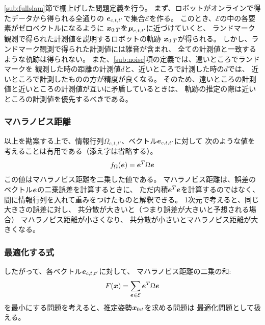 \ref{sub:fullslam}節で棚上げした問題定義を行う。
まず、ロボットがオンラインで得たデータから得られる全通りの
$\boldsymbol{e}_{c,t,t'}$で集合$\mathcal{E}$を作る。
このとき、$\mathcal{E}$の中の各要素がゼロベクトルになるように
$\boldsymbol{x}_{0:T}$を$\boldsymbol{\mu}_{c,t,t'}$に近づけていくと、
ランドマーク観測で得られた計測値を説明するロボットの軌跡
$\boldsymbol{x}_{0:T}$が得られる。
しかし、ランドマーク観測で得られた計測値には雑音が含まれ、
全ての計測値と一致するような軌跡は得られない。
また、\ref{sub:noise}項の定義では、遠いところでランドマークを
観測した時の距離の計測値$d$と、近いところで計測した時の$d$では、
近いところで計測したものの方が精度が良くなる。
そのため、遠いところの計測値と近いところの計測値が互いに矛盾しているときは、
軌跡の推定の際は近いところの計測値を優先するべきである。

\subsubsection{マハラノビス距離}

以上を勘案する上で、情報行列$\Omega_{c,t,t'}$、ベクトル$\boldsymbol{e}_{c,t,t'}$に対して
次のような値を考えることは有用である（添え字は省略する）。
\begin{align}
	f_\Omega(\boldsymbol{e}) = \boldsymbol{e}^T \Omega \boldsymbol{e}
\end{align}
この値はマハラノビス距離を二乗した値である。
マハラノビス距離は、誤差のベクトル$\boldsymbol{e}$の二乗誤差を計算するときに、
ただ内積$\boldsymbol{e}^T \boldsymbol{e}$を計算するのではなく、
間に情報行列を入れて重みをつけたものと解釈できる。
1次元で考えると、同じ大きさの誤差に対し、
共分散が大きいと（つまり誤差が大きいと予想される場合）
マハラノビス距離が小さくなり、
共分散が小さいとマハラノビス距離が大きくなる。

\subsubsection{最適化する式}

したがって、各ベクトル$\boldsymbol{e}_{c,t,t'}$に対して、
マハラノビス距離の二乗の和: 
\begin{align}
	F(\boldsymbol{x}) = \sum_{\boldsymbol{e} \in \mathcal{E}} \boldsymbol{e}^T \Omega \boldsymbol{e}
\end{align}
を最小にする問題を考えると、推定姿勢$\boldsymbol{x}_{0:t}$を求める問題は
最適化問題として扱える。


